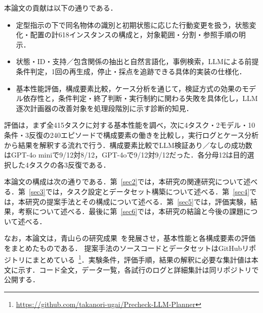 本論文の貢献は以下の通りである．
\begin{itemize}
    \item 定型指示の下で同名物体の識別と初期状態に応じた行動変更を扱う，状態変化・配置の計618インスタンスの構成と，対象範囲・分割・参照手順の明示．
    \item 状態・ID・支持／包含関係の抽出と自然言語化，事例検索，LLMによる前提条件判定，1回の再生成，停止・採点を追跡できる具体的実装の仕様化．
    \item 基本性能評価，構成要素比較，ケース分析を通じて，検証方式の効果のモデル依存性と，条件判定・終了判断・実行制約に関わる失敗を具体化し，LLM逐次計画器の改善対象を処理段階別に示す診断的知見．
\end{itemize}

評価は，まず全415タスクに対する基本性能を調べ，次に4タスク・2モデル・10条件・3反復の240エピソードで構成要素の働きを比較し，実行ログとケース分析から結果を解釈する流れで行う．構成要素比較でLLM検証あり／なしの成功数はGPT-4o miniで9/12対8/12，GPT-4oで9/12対9/12だった．各分母12は目的選択した4タスクの各3反復である．

本論文の構成は次の通りである．第~\ref{sec2}では，本研究の関連研究について述べる．第~\ref{sec3}では，タスク設定とデータセット構築について述べる．第~\ref{sec4}では，本研究の提案手法とその構成について述べる．第~\ref{sec5}では，評価実験，結果，考察について述べる．最後に第~\ref{sec6}では，本研究の結論と今後の課題について述べる．

なお，本論文は，青山らの研究成果~\cite{青山2024,Aoyama2025}を発展させ，基本性能と各構成要素の評価をまとめたものである．
提案手法のソースコードとデータセットはGitHubリポジトリにまとめている~\footnote{\url{https://github.com/takanori-ugai/Precheck-LLM-Planner}}．実験条件，評価手順，結果の解釈に必要な集計値は本文に示す．コード全文，データ一覧，各試行のログと詳細集計は同リポジトリで公開する．
